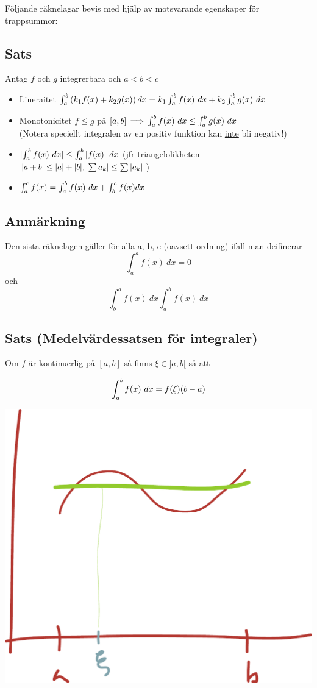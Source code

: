 \documentclass{article}
\begin{document}
Följande räknelagar bevis med hjälp av motsvarande egenskaper för trappsummor:

\subsection{Sats} Antag $f$ och $g$ integrerbara och $a<b<c$
\begin{itemize}
  \item Lineraitet $\int_a^b{\pa{k_1 f(x) + k_2 g(x)}dx} = k_1\int^b_a{f(x)\ dx} + k_2\int^b_a{g(x)\ dx}$
  \item Monotonicitet $f\le g$ på $[a,b] \operatorname{\implies} \int^b_a{f(x)\ dx} \le \int^b_a{g(x)\ dx}$
    \\(Notera speciellt integralen av en positiv funktion kan \uline{inte} bli negativ!)
  \item $\lvert\int^b_a{f(x)\ dx}\rvert \le \int^b_a{\lvert f(x)\rvert\ dx}$ (jfr triangelolikheten $\lvert a+b\rvert\le \lvert a\rvert + \lvert b\rvert, \lvert\sum{a_k}\rvert\le\sum{\lvert a_k\rvert}$)
  \item $\int^c_a{f(x)} = \int^b_a{f(x)\ dx} + \int^c_b{f(x) dx}$
\end{itemize}

\subsection{Anmärkning}
Den sista räknelagen gäller för alla a, b, c (oavsett ordning) ifall man deifinerar
$$ \int^a_a{f(x)\ dx}=0 $$ och $$\int^a_b{f(x)\ dx}\int^b_a{f(x)\ dx}$$

\subsection{Sats (Medelvärdessatsen för integraler)}
Om $f$ är kontinuerlig på $[a,b]$ så finns $\xi \in ]a,b[$ så att

$$ \int^b_a{f(x)\ dx} = f(\xi)(b-a) $$

\includegraphics[scale=0.25]{img/img4.pdf}\\
\end{document}
